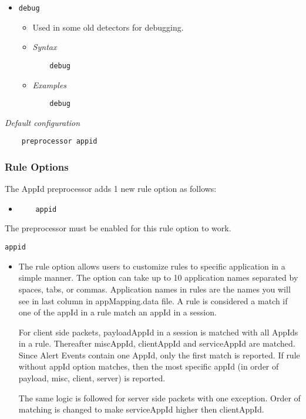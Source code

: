 \documentclass[english]{report}
\begin{document}
\begin{itemize}
\item[] \texttt{debug}
\begin{itemize}
\item[]
      Used in some old detectors for debugging.
\item[] \textit{Syntax}
\begin{verbatim}
    debug
\end{verbatim}
\item[] \textit{Examples}
\begin{verbatim}
    debug
\end{verbatim}
\end{itemize}

\end{itemize}
\normalsize

\textit{Default configuration}
\footnotesize
\begin{verbatim}
    preprocessor appid
\end{verbatim}
\normalsize

\subsubsection{Rule Options}
The AppId preprocessor adds 1 new rule option as follows:

\begin{itemize}
\item[]
\begin{verbatim}
    appid
\end{verbatim}
\end{itemize}

The preprocessor must be enabled for this rule option to work.

\texttt{appid}
\label{appid:appid}
\begin{itemize}
 \item[] 
The rule option allows users to customize
rules to specific application in a simple manner. The option can take up to 10
application names separated by spaces, tabs, or commas. Application names in
rules are the names you will see in last column in appMapping.data file.  A
rule is considered a match if one of the appId in a rule match an appId in a
session. 

For client side packets, payloadAppId in a session is matched with all AppIds
in a rule.  Thereafter miscAppId, clientAppId and serviceAppId are matched.
Since Alert Events contain one AppId, only the first match is reported. If rule
without appId option matches, then the most specific appId (in order of
payload, misc, client, server) is reported.

The same logic is followed for server side packets with one exception. Order of
matching is changed to make serviceAppId higher then clientAppId.

\end{itemize}
\end{document}
